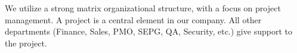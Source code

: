 
We utilize a strong matrix organizational structure, with a focus
on project management. A project is a central element in our company.
All other departments (Finance, Sales, PMO, SEPG, QA, Security, etc.)
give support to the project.
